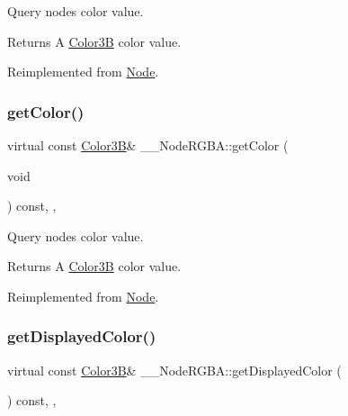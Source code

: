 Query node\textquotesingle{}s color value. \begin{DoxyReturn}{Returns}
A \hyperlink{structColor3B}{Color3B} color value. 
\end{DoxyReturn}


Reimplemented from \hyperlink{classNode_a06721d272f5a59e02e355d95be25bb99}{Node}.

\mbox{\label{class____NodeRGBA_a730149ff787a7a86d78a5c0d0aecddda}} 
\subsubsection{\texorpdfstring{get\+Color()}{getColor()}\hspace{0.1cm}{\footnotesize\ttfamily [2/2]}}
{\footnotesize\ttfamily virtual const \hyperlink{structColor3B}{Color3B}\& \+\_\+\+\_\+\+Node\+R\+G\+B\+A\+::get\+Color (\begin{DoxyParamCaption}\item[{void}]{ }\end{DoxyParamCaption}) const\hspace{0.3cm}{\ttfamily [inline]}, {\ttfamily [override]}, {\ttfamily [virtual]}}

Query node\textquotesingle{}s color value. \begin{DoxyReturn}{Returns}
A \hyperlink{structColor3B}{Color3B} color value. 
\end{DoxyReturn}


Reimplemented from \hyperlink{classNode_a06721d272f5a59e02e355d95be25bb99}{Node}.

\mbox{\label{class____NodeRGBA_ae17a9077b86673cb75f799cb4f6c8a1d}} 
\subsubsection{\texorpdfstring{get\+Displayed\+Color()}{getDisplayedColor()}\hspace{0.1cm}{\footnotesize\ttfamily [1/2]}}
{\footnotesize\ttfamily virtual const \hyperlink{structColor3B}{Color3B}\& \+\_\+\+\_\+\+Node\+R\+G\+B\+A\+::get\+Displayed\+Color (\begin{DoxyParamCaption}{ }\end{DoxyParamCaption}) const\hspace{0.3cm}{\ttfamily [inline]}, {\ttfamily [override]}, {\ttfamily [virtual]}}

